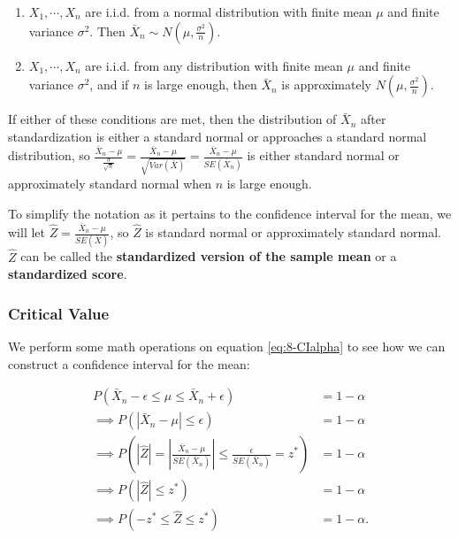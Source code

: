 \documentclass[
]{book}
\begin{document}
\begin{enumerate}
\def\labelenumi{\arabic{enumi}.}
\item
  \(X_1, \cdots, X_n\) are i.i.d. from a normal distribution with finite mean \(\mu\) and finite variance \(\sigma^2\). Then \(\bar{X}_n \sim N(\mu, \frac{\sigma^2}{n})\).
\item
  \(X_1, \cdots, X_n\) are i.i.d. from any distribution with finite mean \(\mu\) and finite variance \(\sigma^2\), and if \(n\) is large enough, then \(\bar{X}_n\) is approximately \(N(\mu, \frac{\sigma^2}{n})\).
\end{enumerate}

If either of these conditions are met, then the distribution of \(\bar{X}_n\) after standardization is either a standard normal or approaches a standard normal distribution, so \(\frac{\bar{X}_n - \mu}{\frac{\sigma}{\sqrt{n}}} = \frac{\bar{X}_n - \mu}{\sqrt{Var(\bar{X})}} = \frac{\bar{X}_n - \mu}{SE(\bar{X}_n)}\) is either standard normal or approximately standard normal when \(n\) is large enough.

To simplify the notation as it pertains to the confidence interval for the mean, we will let \(\hat{Z} = \frac{\bar{X}_n - \mu}{SE(\bar{X})}\), so \(\hat{Z}\) is standard normal or approximately standard normal. \(\hat{Z}\) can be called the \textbf{standardized version of the sample mean} or a \textbf{standardized score}.

\subsubsection{Critical Value}\label{critical-value}

We perform some math operations on equation \eqref{eq:8-CIalpha} to see how we can construct a confidence interval for the mean:

\begin{equation} 
\begin{split}
P(\bar{X}_n - \epsilon \leq \mu \leq \bar{X}_n + \epsilon) &= 1 - \alpha \\
\implies P(|\bar{X}_n - \mu| \leq \epsilon) &= 1 - \alpha \\
\implies P \left(|\hat{Z}| = |\frac{\bar{X}_n - \mu}{SE(\bar{X}_n)}|  \leq \frac{\epsilon}{SE(\bar{X}_n)} = z^{*} \right) &= 1 - \alpha \\
\implies P(|\hat{Z}| \leq z^{*}) &= 1 - \alpha \\
\implies P(-z^{*} \leq \hat{Z} \leq z^{*}) &= 1 - \alpha.
\end{split}
\label{eq:8-CIcrit}
\end{equation}
\end{document}
